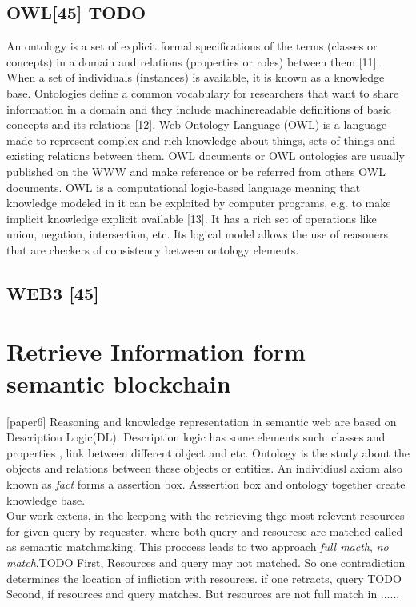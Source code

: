  \subsection{OWL[45] TODO}
 An ontology is a set of explicit formal specifications of the
 terms (classes or concepts) in a domain and relations (properties
 or roles) between them [11]. When a set of individuals
 (instances) is available, it is known as a knowledge base. Ontologies
 define a common vocabulary for researchers that want
 to share information in a domain and they include machinereadable
 definitions of basic concepts and its relations [12].
 Web Ontology Language (OWL) is a language made to
 represent complex and rich knowledge about things, sets of
 things and existing relations between them. OWL documents
 or OWL ontologies are usually published on the WWW and
 make reference or be referred from others OWL documents.
 OWL is a computational logic-based language meaning that
 knowledge modeled in it can be exploited by computer programs,
 e.g. to make implicit knowledge explicit available [13].
 It has a rich set of operations like union, negation, intersection,
 etc. Its logical model allows the use of reasoners that are
 checkers of consistency between ontology elements.
 \subsection{WEB3 [45]}
 
 \section{Retrieve Information form semantic blockchain}[paper6]
 Reasoning and knowledge representation in semantic web are based on Description Logic(DL). Description logic has some elements such: classes and properties , link between different object and etc. Ontology is the study about the objects and relations between these objects or entities.
 An individiusl axiom also known as \textit{fact} forms a assertion box. Asssertion box and ontology together create knowledge base.\\
 Our work extens, in the keepong with the retrieving thge most relevent resources for given query by requester, where both query and resourcse are matched called as semantic matchmaking. This proccess leads to two approach \textit{full macth}, \textit{no match}.TODO  
 First, Resources and query may not matched. So one contradiction determines the location of infliction with resources. if one retracts, query TODO
 Second, if resources and query matches. But resources are not full match in ......
 
